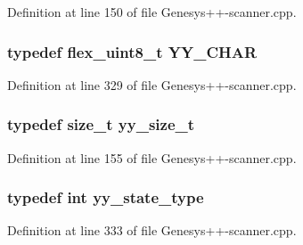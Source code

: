 Definition at line 150 of file Genesys++-\/scanner.\-cpp.

\hypertarget{_genesys_09_09-scanner_8cpp_acc1e625a829554ffed5e4307d4a5f6b7}{
\subsubsection[{Y\-Y\-\_\-\-C\-H\-A\-R}]{\setlength{\rightskip}{0pt plus 5cm}typedef {\bf flex\-\_\-uint8\-\_\-t} {\bf Y\-Y\-\_\-\-C\-H\-A\-R}}}\label{_genesys_09_09-scanner_8cpp_acc1e625a829554ffed5e4307d4a5f6b7}


Definition at line 329 of file Genesys++-\/scanner.\-cpp.

\hypertarget{_genesys_09_09-scanner_8cpp_ad557845057f187eec4be07e2717d2afa}{
\subsubsection[{yy\-\_\-size\-\_\-t}]{\setlength{\rightskip}{0pt plus 5cm}typedef size\-\_\-t {\bf yy\-\_\-size\-\_\-t}}}\label{_genesys_09_09-scanner_8cpp_ad557845057f187eec4be07e2717d2afa}


Definition at line 155 of file Genesys++-\/scanner.\-cpp.

\hypertarget{_genesys_09_09-scanner_8cpp_a9ba7c416f135b0f0c1f4addded4616b5}{
\subsubsection[{yy\-\_\-state\-\_\-type}]{\setlength{\rightskip}{0pt plus 5cm}typedef int {\bf yy\-\_\-state\-\_\-type}}}\label{_genesys_09_09-scanner_8cpp_a9ba7c416f135b0f0c1f4addded4616b5}


Definition at line 333 of file Genesys++-\/scanner.\-cpp.



